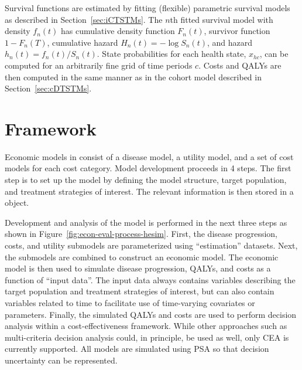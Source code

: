\documentclass[article, nojss]{jss}\usepackage[]{graphicx}\usepackage[]{color}
\begin{document}
Survival functions are estimated by fitting (flexible) parametric survival models as described in Section~\ref{sec:iCTSTMs}. The $n$th fitted survival model with density $f_n(t)$ has cumulative density function $F_n(t)$, survivor function $1 - F_n(T)$, cumulative hazard $H_n(t) = -\log S_n(t)$, and hazard $h_n(t) = f_n(t)/S_n(t)$. State probabilities for each health state, $x_{hc}$, can be computed for an arbitrarily fine grid of time periods $c$. Costs and QALYs are then computed in the same manner as in the cohort model described in Section~\ref{sec:cDTSTMs}.

\section{Framework} \label{sec:framework}
Economic models in  consist of a disease model, a utility model, and a set of cost models for each cost category. Model development proceeds in 4 steps. The first step is to set up the model by defining the model structure, target population, and treatment strategies of interest. The relevant information is then stored in a  object. 

Development and analysis of the model is performed in the next three steps as shown in Figure~\ref{fig:econ-eval-process-hesim}. First, the disease progression, costs, and utility submodels are parameterized using ``estimation'' datasets. Next, the submodels are combined to construct an economic model. The economic model is then used to simulate disease progression, QALYs, and costs as a function of ``input data''. The input data always contains variables describing the target population and treatment strategies of interest, but can also contain variables related to time to facilitate use of time-varying covariates or parameters. Finally, the simulated QALYs and costs are used to perform decision analysis within a cost-effectiveness framework. While other approaches such as multi-criteria decision analysis could, in principle, be used as well, only CEA is currently supported. All models are simulated using PSA so that decision uncertainty can be represented.  
\end{document}
